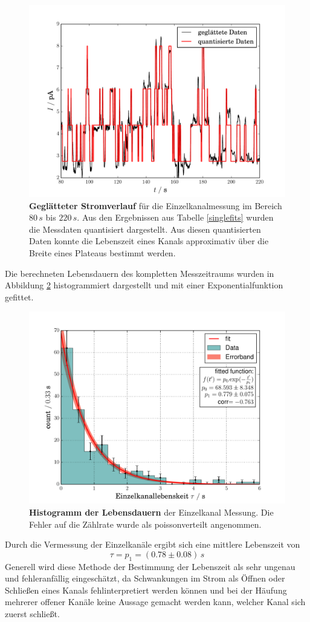 \documentclass{include/thesisclass3}
\newcommand{\e}[1]{\,\si{#1}}
\begin{document}
\begin{figure}[H]
\centering
\includegraphics[scale=0.7]{images/quantisierung.pdf}
\caption{\textbf{Geglätteter Stromverlauf} für die Einzelkanalmessung im Bereich $80\e{s}$ bis $220\e{s}$. Aus den  Ergebnissen aus Tabelle \ref{singlefits} wurden die Messdaten quantisiert dargestellt. Aus diesen quantisierten Daten konnte die Lebenszeit eines Kanals approximativ über die Breite eines Plateaus bestimmt werden.}
\label{quant}
\end{figure}
Die berechneten Lebensdauern des kompletten Messzeitraums wurden in Abbildung \ref{poiss} histogrammiert dargestellt und mit einer Exponentialfunktion gefittet. 
\begin{figure}[H]
\centering
\includegraphics[scale=0.7]{images/poiss.pdf}
\caption{\textbf{Histogramm der Lebensdauern} der Einzelkanal Messung. Die Fehler auf die Zählrate wurde als poissonverteilt angenommen.}
\label{poiss}
\end{figure}
Durch die Vermessung der Einzelkanäle ergibt sich eine mittlere Lebenszeit von
\[ \tau = p_1 = (0.78 \pm 0.08)\e{s}\]
Generell wird diese Methode der Bestimmung der Lebenszeit als sehr ungenau und fehleranfällig eingeschätzt, da Schwankungen im Strom als Öffnen oder Schließen eines Kanals fehlinterpretiert werden können und bei der Häufung mehrerer offener Kanäle keine Aussage gemacht werden kann, welcher Kanal sich zuerst schließt. 
\end{document}
